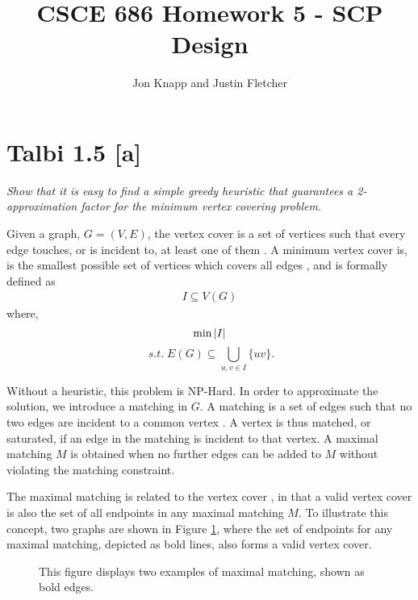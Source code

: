 \documentclass[12pt]{article}
\begin{document}
\title{CSCE 686 Homework 5 - SCP Design}
\author{Jon Knapp and Justin Fletcher}
\maketitle

\section{Talbi 1.5 [a]}
\textit{Show that it is easy to find a simple greedy heuristic that guarantees a 2-approximation factor for the minimum vertex covering problem.}
\linebreak

Given a graph, $G=(V, E)$, the vertex cover is a set of vertices such that every edge touches, or is incident to, at least one of them \cite{Lecture21}. A minimum vertex cover is, is the smallest possible set of vertices which covers all edges \cite{Dartmouth}, and is formally defined as
\begin{align*}
I\subseteq V(G) 
\end{align*} 
where,
\begin{equation*}
\min |I| \\
\end{equation*}
\begin{equation*}
\; s.t. \; E(G)\subseteq \bigcup_{u,v \in I}\{uv\}.
\end{equation*}


Without a heuristic, this problem is NP-Hard. In order to approximate the solution, we introduce a matching in $G$. A matching is a set of edges such that no two edges are incident to a common vertex \cite{Suhendry}. A vertex is thus matched, or saturated, if an edge in the matching is incident to that vertex. A maximal matching $M$ is obtained when no further edges can be added to $M$ without violating the matching constraint.

The maximal matching is related to the vertex cover \cite{Suhendry}, in that a valid vertex cover is also the set of all endpoints in any maximal matching $M$. To illustrate this concept, two graphs are shown in Figure  \ref{fig:maximalmatchings}, where the set of endpoints for any maximal matching, depicted as bold lines, also forms a valid vertex cover.


\begin{figure} \label{fig:maximalmatchings}
	
	
	\begin{minipage}[b]{0.5\linewidth}
		
		\centering
	\end{minipage}
	\hfill
	
	\caption{This figure displays two examples of maximal matching, shown as bold edges.}
	
	
\end{figure}
\end{document}
